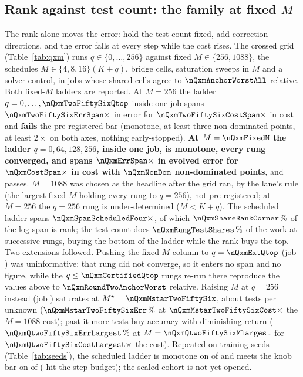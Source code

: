 \subsection{Rank against test count: the family at fixed $M$}
\label{sec:exp:qxm}

The rank alone moves the error: hold the test count fixed, add correction
directions, and the error falls at every step while the cost rises. The crossed
grid (Table~\ref{tab:qxm}) runs $q\in\{0,\dots,256\}$ against fixed
$M\in\{256,1088\}$, the schedules $M\in\{4,8,16\}(K+q)$, bridge cells,
saturation sweeps in $M$ and a solver control, in \nQxmJobCount{} jobs whose
shared cells agree to $\nQxmAnchorWorstAll$ relative. Both fixed-$M$ ladders
are reported. At
$M=256$ the ladder $q=0,\dots,\nQxmTwoFiftySixQtop$ inside one job spans
$\nQxmTwoFiftySixErrSpan\times$ in error for $\nQxmTwoFiftySixCostSpan\times$
in cost and \textbf{fails} the pre-registered bar (monotone, at least three
non-dominated points, at least $2\times$ on both axes, nothing early-stopped).
\textbf{At $M=\nQxmFixedM$ the ladder $q=0,64,128,256$, inside one job, is
monotone, every rung converged, and spans $\nQxmErrSpan\times$ in evolved error
for $\nQxmCostSpan\times$ in cost with $\nQxmNonDom$ non-dominated points}, and
passes. $M=1088$ was chosen as the headline after the grid ran, by the lane's
rule (the largest fixed $M$ holding every rung to $q=256$), not
pre-registered; at $M=256$ the $q=256$ rung is under-determined ($M<K+q$).
The scheduled ladder spans $\nQxmSpanScheduledFour\times$, of which
$\nQxmShareRankCorner\,\%$ of the log-span is rank; the test count does
$\nQxmRungTestShares\,\%$ of the work at successive rungs, buying the bottom
of the ladder while the rank buys the top. Two extensions followed. Pushing the
fixed-$M$ column to $q=\nQxmExtQtop$ (job \nQxmExtJob) was uninformative: that
rung did not converge, so it enters no span and no figure, while the
$q\le\nQxmCertifiedQtop$ rungs re-run there reproduce the values above to
$\nQxmRoundTwoAnchorWorst$ relative. Raising $M$ at $q=256$ instead (job
\provQxmSaturationTwoFiftySixJob) saturates at $M^\star=\nQxmMstarTwoFiftySix$,
about \nQxmMstarTwoFiftySixTpu{} tests per unknown
($\nQxmMstarTwoFiftySixErr\,\%$ at $\nQxmMstarTwoFiftySixCost\times$ the
$M=1088$ cost); past it more tests buy accuracy with diminishing return
($\nQxmQtwoFiftySixErrLargest\,\%$ at $M=\nQxmQtwoFiftySixMlargest$ for
$\nQxmQtwoFiftySixCostLargest\times$ the cost). Repeated on \nSeedsCount{}
training seeds (Table~\ref{tab:seeds}), the scheduled ladder is monotone on
\nSeedsMonotoneEvolved{} of \nSeedsCount{} and meets the knob bar on
\nSeedsKnobBar{} of \nSeedsCount{} (\nSeedsUnconvergedCells{} hit the step
budget); the sealed cohort is not yet opened.

